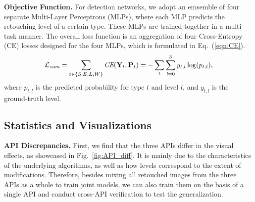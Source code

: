 \documentclass[sigconf]{acmart}
\begin{document}
\noindent\textbf{Objective Function.}
For detection networks, we adopt an emsemble of four separate Multi-Layer Perceptrons (MLPs), where each MLP predicts the retouching level of a certain type. These MLPs are trained together in a multi-task manner. The overall loss function is an aggregation of four Cross-Entropy (CE) losses designed for the four MLPs, which is formulated in Eq.~(\ref{eqn:CE}).
\begin{equation}
\label{eqn:CE}
\mathcal{L}_{\emph{sum}}=\sum_{t\in\{S,E,L,W\}}\emph{CE}(\mathbf{Y}_{t},\mathbf{P}_{t})=-\sum_{t} \sum_{\emph{l}=0}^{3}y_{t,l}\log({p}_{t,l}),
\end{equation}
where $p_{t,l}$ is the predicted probability for type $t$ and level $l$, and $y_{t,l}$ is the ground-truth level. 


\subsection{Statistics and Visualizations}
\noindent\textbf{API Discrepancies.}
First, we find that the three APIs differ in the visual effects, as showcased in Fig.~\ref{fig:API_diff}.
It is mainly due to the characteristics of the underlying algorithms, as well as how levels correspond to the extent of modifications.
Therefore, besides mixing all retouched images from the three APIs as a whole to train joint models, we can also train them on the basis of a single API and conduct cross-API verification to test the generalization.
\end{document}
